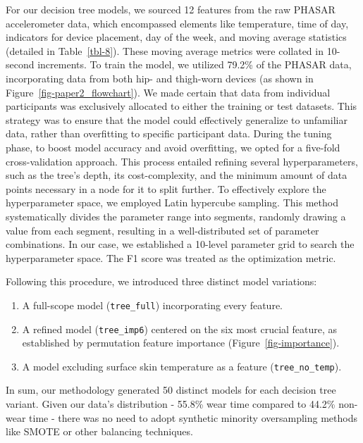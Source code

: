 \documentclass[
  10pt,
]{scrbook}
\begin{document}
For our decision tree models, we sourced 12 features from the raw PHASAR
accelerometer data, which encompassed elements like temperature, time of
day, indicators for device placement, day of the week, and moving
average statistics (detailed in Table~\ref{tbl-8}). These moving average
metrics were collated in 10-second increments. To train the model, we
utilized 79.2\% of the PHASAR data, incorporating data from both hip-
and thigh-worn devices (as shown in Figure~\ref{fig-paper2_flowchart}).
We made certain that data from individual participants was exclusively
allocated to either the training or test datasets. This strategy was to
ensure that the model could effectively generalize to unfamiliar data,
rather than overfitting to specific participant data. During the tuning
phase, to boost model accuracy and avoid overfitting, we opted for a
five-fold cross-validation approach. This process entailed refining
several hyperparameters, such as the tree's depth, its cost-complexity,
and the minimum amount of data points necessary in a node for it to
split further. To effectively explore the hyperparameter space, we
employed Latin hypercube sampling. This method systematically divides
the parameter range into segments, randomly drawing a value from each
segment, resulting in a well-distributed set of parameter combinations.
In our case, we established a 10-level parameter grid to search the
hyperparameter space. The F1 score was treated as the optimization
metric.

Following this procedure, we introduced three distinct model variations:

\begin{enumerate}
\def\labelenumi{\arabic{enumi}.}
\item
  A full-scope model (\texttt{tree\_full}) incorporating every feature.
\item
  A refined model (\texttt{tree\_imp6}) centered on the six most crucial
  feature, as established by permutation feature importance
  (Figure~\ref{fig-importance}).
\item
  A model excluding surface skin temperature as a feature
  (\texttt{tree\_no\_temp}).
\end{enumerate}

In sum, our methodology generated 50 distinct models for each decision
tree variant. Given our data's distribution - 55.8\% wear time compared
to 44.2\% non-wear time - there was no need to adopt synthetic minority
oversampling methods like SMOTE or other balancing techniques.
\end{document}
